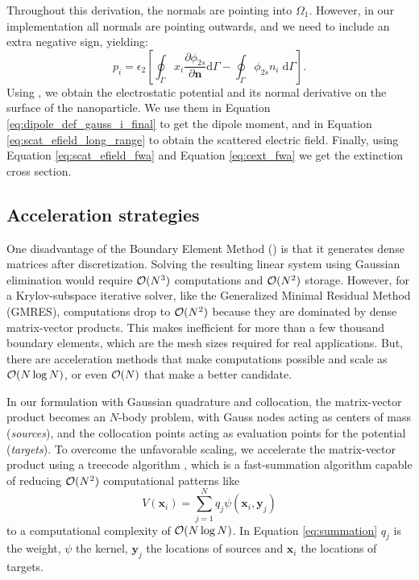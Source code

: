 %
Throughout this derivation, the normals are pointing into $\Omega_1$. However, in our implementation 
all normals are pointing outwards, and we need to include an extra negative sign, yielding:
%
\begin{equation} \label{eq:dipole_def_gauss_i_final}
{p_i} = \epsilon_2 \left[ \oint_\Gamma  x_i  \frac{\partial \phi_{2s}}{\partial \mathbf{n}} \text{d}\Gamma - \oint_\Gamma \phi_{2s} n_i \; \text{d}\Gamma \right].
\end{equation}
%
Using \bem, we obtain the electrostatic potential and its normal derivative on the surface of the nanoparticle. We use
them in Equation \eqref{eq:dipole_def_gauss_i_final} to get the dipole 
moment, and in Equation \eqref{eq:scat_efield_long_range} to obtain the scattered
electric field. Finally, using Equation \eqref{eq:scat_efield_fwa} and Equation 
\eqref{eq:cext_fwa} we get the extinction cross section.

\subsection{Acceleration strategies} \label{sec:acc_strategies}

One disadvantage of the Boundary Element Method (\bem) is that it generates dense matrices
after discretization. Solving the resulting linear system using
Gaussian elimination would require $\mathcal{O}(N^3)$ computations and $\mathcal{O}(N^2)$ storage. However, for a
Krylov-subspace iterative solver, like the Generalized Minimal Residual Method (GMRES),
computations drop to $\mathcal{O}(N^2)$ because they are dominated by dense matrix-vector 
products. This makes \bem inefficient for more than a few thousand boundary elements,
which are the mesh sizes required for real applications. But, there are acceleration methods
that make computations possible and scale as $\mathcal{O}(N \log N)$, or even $\mathcal{O}(N)$ that make \bem a better candidate.

In our formulation with Gaussian quadrature and collocation, the matrix-vector product
becomes an $N$-body problem, with Gauss nodes acting as centers of mass (\emph{sources}), 
and the collocation points acting as evaluation points for the potential (\emph{targets}).
To overcome the unfavorable scaling, we accelerate the matrix-vector product using a 
treecode algorithm \cite{BarnesHut1986,DuanKrasny2001}, which is a fast-summation algorithm capable of reducing $\mathcal{O}(N^2)$
computational patterns like
%
\begin{equation} \label{eq:summation}
V(\mathbf{x}_i) = \sum_{j=1}^{N} q_j \psi(\mathbf{x}_i, \mathbf{y}_j) 
\end{equation}
%
to a computational complexity of $\mathcal{O}(N \log N)$. In Equation \eqref{eq:summation} 
$q_j$ is the weight, $\psi$ the kernel, $\mathbf{y}_j$ the locations of sources and 
$\mathbf{x}_i$ the locations of targets.

